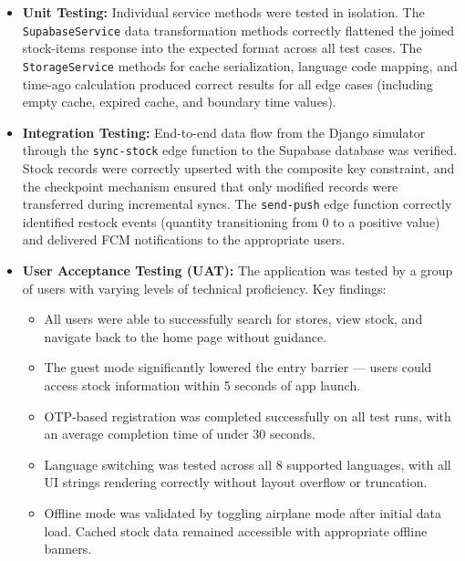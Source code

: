\begin{itemize}
    \item \textbf{Unit Testing:} Individual service methods were tested in isolation. The \newline \texttt{SupabaseService} data transformation methods correctly flattened the joined stock-items response into the expected format across all test cases. The \newline \texttt{StorageService} methods for cache serialization, language code mapping, and time-ago calculation produced correct results for all edge cases (including empty cache, expired cache, and boundary time values).

    \item \textbf{Integration Testing:} End-to-end data flow from the Django simulator through the \texttt{sync-stock} edge function to the Supabase database was verified. Stock records were correctly upserted with the composite key constraint, and the checkpoint mechanism ensured that only modified records were transferred during incremental syncs. The \texttt{send-push} edge function correctly identified restock events (quantity transitioning from 0 to a positive value) and delivered FCM notifications to the appropriate users.

    \item \textbf{User Acceptance Testing (UAT):} The application was tested by a group of users with varying levels of technical proficiency. Key findings:
    \begin{itemize}
        \item All users were able to successfully search for stores, view stock, and navigate back to the home page without guidance.
        \item The guest mode significantly lowered the entry barrier --- users could access stock information within 5 seconds of app launch.
        \item OTP-based registration was completed successfully on all test runs, with an average completion time of under 30 seconds.
        \item Language switching was tested across all 8 supported languages, with all UI strings rendering correctly without layout overflow or truncation.
        \item Offline mode was validated by toggling airplane mode after initial data load. Cached stock data remained accessible with appropriate offline banners.
    \end{itemize}
\end{itemize}

